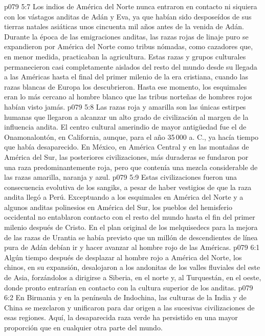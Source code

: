 \vs p079 5:7 Los indios de América del Norte nunca entraron en contacto ni siquiera con los vástagos anditas de Adán y Eva, ya que habían sido desposeídos de sus tierras natales asiáticas unos cincuenta mil años antes de la venida de Adán. Durante la época de las emigraciones anditas, las razas rojas de linaje puro se expandieron por América del Norte como tribus nómadas, como cazadores que, en menor medida, practicaban la agricultura. Estas razas y grupos culturales permanecieron casi completamente aislados del resto del mundo desde su llegada a las Américas hasta el final del primer milenio de la era cristiana, cuando las razas blancas de Europa los descubrieron. Hasta ese momento, los esquimales eran lo más cercano al hombre blanco que las tribus norteñas de hombres rojos habían visto jamás.
\vs p079 5:8 Las razas roja y amarilla son las únicas estirpes humanas que llegaron a alcanzar un alto grado de civilización al margen de la influencia andita. El centro cultural amerindio de mayor antigüedad fue el de Onamonalontón, en California, aunque, para el año 35\,000 a. C., ya hacía tiempo que había desaparecido. En México, en América Central y en las montañas de América del Sur, las posteriores civilizaciones, más duraderas se fundaron por una raza predominantemente roja, pero que contenía una mezcla considerable de las razas amarilla, naranja y azul.
\vs p079 5:9 Estas civilizaciones fueron una consecuencia evolutiva de los sangiks, a pesar de haber vestigios de que la raza andita llegó a Perú. Exceptuando a los esquimales en América del Norte y a algunos anditas polinesios en América del Sur, los pueblos del hemisferio occidental no entablaron contacto con el resto del mundo hasta el fin del primer milenio después de Cristo. En el plan original de los melquisedecs para la mejora de las razas de Urantia se había previsto que un millón de descendientes de línea pura de Adán debían ir y hacer avanzar al hombre rojo de las Américas.
\vs p079 6:1 Algún tiempo después de desplazar al hombre rojo a América del Norte, los chinos, en su expansión, desalojaron a los andonitas de los valles fluviales del este de Asia, forzándolos a dirigirse a Siberia, en el norte y, al Turquestán, en el oeste, donde pronto entrarían en contacto con la cultura superior de los anditas.
\vs p079 6:2 En Birmania y en la península de Indochina, las culturas de la India y de China se mezclaron y unificaron para dar origen a las sucesivas civilizaciones de esas regiones. Aquí, la desaparecida raza verde ha persistido en una mayor proporción que en cualquier otra parte del mundo.

